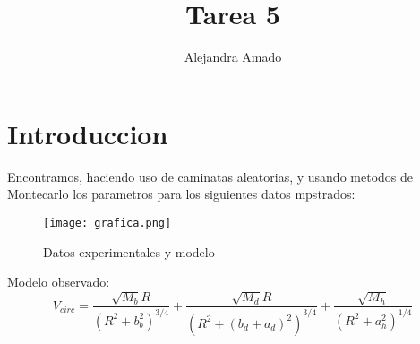\documentclass{article}
\begin{document}
\title{Tarea 5}
\author{Alejandra Amado}
\maketitle
\section{Introduccion}
Encontramos, haciendo uso de caminatas aleatorias, y usando metodos de Montecarlo los parametros para los siguientes datos mpstrados:
\begin{figure}
    \centering
    \texttt{[image: grafica.png]}
    \caption{Datos experimentales y modelo}
    \label{fig:exp_vs_mod}
\end{figure}

Modelo observado:
\begin{equation}
V_{circ} = \frac{\sqrt{M_b}R}{(R^2+b_b^2)^{3/4}} + 
\frac{\sqrt{M_d}R}{(R^2+(b_d+a_d)^2)^{3/4}} +
\frac{\sqrt{M_h}}{(R^2+a_h^2)^{1/4}} 
\end{equation}
\end{document}
